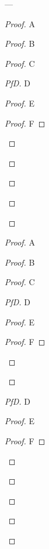 \documentclass{article}
\begin{document}
    \tiny
    \tt


    ---

    \begin{proof}
        A
        \begin{proof}
            B
            \begin{proof}
                C
                \begin{proof}[PfD]
                    D
                    \begin{proof}
                        E
                        \begin{proof}
                            F
                        \end{proof}
                    \end{proof}
                \end{proof}
            \end{proof}
        \end{proof}
    \end{proof}
    \begin{proof}
        A
        \begin{proof}
            B
            \begin{proof}
                C
                \begin{proof}[PfD]
                    D
                    \begin{proof}
                        E
                        \begin{proof}
                            F
                        \end{proof}
                    \end{proof}
                \end{proof}
                \begin{proof}[PfD]
                    D
                    \begin{proof}
                        E
                        \begin{proof}
                            F
                        \end{proof}
                    \end{proof}
                \end{proof}
            \end{proof}
        \end{proof}
    \end{proof}
\end{document}
